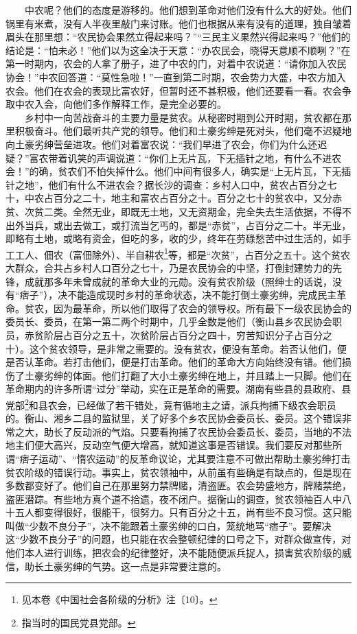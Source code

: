 \documentclass[cn,11pt,chinese]{elegantbook}
\begin{document}
　　中农呢？他们的态度是游移的。他们想到革命对他们没有什么大的好处。他们锅里有米煮，没有人半夜里敲门来讨账。他们也根据从来有没有的道理，独自皱着眉头在那里想：“农民协会果然立得起来吗？”“三民主义果然兴得起来吗？”他们的结论是：“怕未必！”他们以为这全决于天意：“办农民会，晓得天意顺不顺咧？”在第一时期内，农会的人拿了册子，进了中农的门，对着中农说道：“请你加入农民协会！”中农回答道：“莫性急啦！”一直到第二时期，农会势力大盛，中农方加入农会。他们在农会的表现比富农好，但暂时还不甚积极，他们还要看一看。农会争取中农入会，向他们多作解释工作，是完全必要的。\\
　　乡村中一向苦战奋斗的主要力量是贫农。从秘密时期到公开时期，贫农都在那里积极奋斗。他们最听共产党的领导。他们和土豪劣绅是死对头，他们毫不迟疑地向土豪劣绅营垒进攻。他们对着富农说：“我们早进了农会，你们为什么还迟疑？”富农带着讥笑的声调说道：“你们上无片瓦，下无插针之地，有什么不进农会！”的确，贫农们不怕失掉什么。他们中间有很多人，确实是“上无片瓦，下无插针之地”，他们有什么不进农会？据长沙的调查：乡村人口中，贫农占百分之七十，中农占百分之二十，地主和富农占百分之十。百分之七十的贫农中，又分赤贫、次贫二类。全然无业，即既无土地，又无资期金，完全失去生活依据，不得不出外当兵，或出去做工，或打流当乞丐的，都是“赤贫”，占百分之二十。半无业，即略有土地，或略有资金，但吃的多，收的少，终年在劳碌愁苦中过生活的，如手工工人、佃农（富佃除外）、半自耕农\footnote[10]{ 见本卷《中国社会各阶级的分析》注〔10〕。}等，都是“次贫”，占百分之五十。这个贫农大群众，合共占乡村人口百分之七十，乃是农民协会的中坚，打倒封建势力的先锋，成就那多年未曾成就的革命大业的元勋。没有贫农阶级（照绅士的话说，没有“痞子”），决不能造成现时乡村的革命状态，决不能打倒土豪劣绅，完成民主革命。贫农，因为最革命，所以他们取得了农会的领导权。所有最下一级农民协会的委员长、委员，在第一第二两个时期中，几乎全数是他们（衡山县乡农民协会职员，赤贫阶层占百分之五十，次贫阶层占百分之四十，穷苦知识分子占百分之十）。这个贫农领导，是非常之需要的。没有贫农，便没有革命。若否认他们，便是否认革命。若打击他们，便是打击革命。他们的革命大方向始终没有错。他们损伤了土豪劣绅的体面。他们打翻了大小土豪劣绅在地上，并且踏上一只脚。他们在革命期内的许多所谓“过分”举动，实在正是革命的需要。湖南有些县的县政府、县党部\footnote[11]{ 指当时的国民党县党部。}和县农会，已经做了若干错处，竟有循地主之请，派兵拘捕下级农会职员的。衡山、湘乡二县的监狱里，关了好多个乡农民协会委员长、委员。这个错误非常之大，助长了反动派的气焰。只要看拘捕了农民协会委员长、委员，当地的不法地主们便大高兴，反动空气便大增高，就知道这事是否错误。我们要反对那些所谓“痞子运动”、“惰农运动”的反革命议论，尤其要注意不可做出帮助土豪劣绅打击贫农阶级的错误行动。事实上，贫农领袖中，从前虽有些确是有缺点的，但是现在多数都变好了。他们自己在那里努力禁牌赌，清盗匪。农会势盛地方，牌赌禁绝，盗匪潜踪。有些地方真个道不拾遗，夜不闭户。据衡山的调查，贫农领袖百人中八十五人都变得很好，很能干，很努力。只有百分之十五，尚有些不良习惯。这只能叫做“少数不良分子”，决不能跟着土豪劣绅的口白，笼统地骂“痞子”。要解决这“少数不良分子”的问题，也只能在农会整顿纪律的口号之下，对群众做宣传，对他们本人进行训练，把农会的纪律整好，决不能随便派兵捉人，损害贫农阶级的威信，助长土豪劣绅的气势。这一点是非常要注意的。\\
\end{document}
